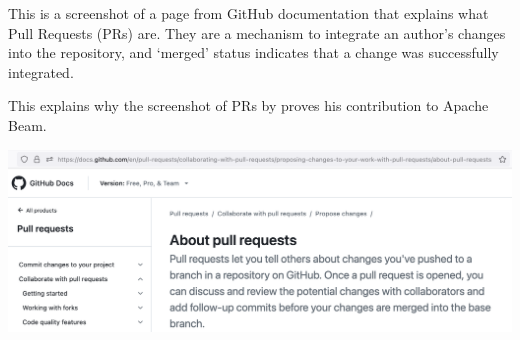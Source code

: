 
This is a screenshot of a page from GitHub documentation that explains what Pull Requests (PRs) are.
They are a mechanism to integrate an author's changes into the repository,
and `merged' status indicates that a change was successfully integrated.

This explains why the screenshot of PRs by \mrl {} proves his contribution to Apache Beam.

\includegraphics[width=\textwidth]{github-prs}

\pagebreak
